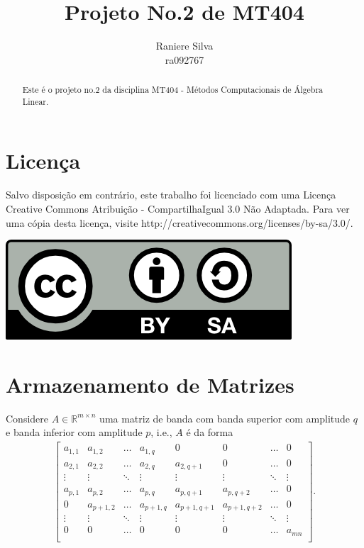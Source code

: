 \documentclass[12pt,a4paper]{article}
\begin{document}
\title{Projeto No.2 de MT404}
\author{Raniere Silva \\ ra092767}
\maketitle
\begin{abstract}
    Este \'{e} o projeto no.2 da disciplina MT404 - M\'{e}todos Computacionais de \'{A}lgebra Linear.
\end{abstract}
\tableofcontents
\lstlistoflistings
\section*{Licen\c{c}a}
Salvo disposi\c{c}\~{a}o em contr\'{a}rio, este trabalho foi licenciado com uma Licen\c{c}a Creative Commons Atribui\c{c}\~{a}o - CompartilhaIgual 3.0 N\~{a}o Adaptada. Para ver uma c\'{o}pia desta licen\c{c}a, visite http://creativecommons.org/licenses/by-sa/3.0/.
\begin{center}
    \includegraphics{../figuras/cc-by-sa.png}
\end{center}
\newpage
\section{Armazenamento de Matrizes}
Considere $A \in \mathbb{R}^{m \times n}$ uma matriz de banda com banda superior com amplitude $q$ e banda inferior com amplitude $p$, i.e., $A$ \'{e} da forma
\begin{align*}
    \begin{bmatrix}
        a_{1,1} & a_{1,2} & \ldots & a_{1,q} & 0 & 0 & \ldots & 0 \\
        a_{2,1} & a_{2,2} & \ldots & a_{2,q} & a_{2,q+1} & 0 & \ldots & 0 \\
        \vdots & \vdots & \ddots & \vdots & \vdots & \vdots & \ddots & \vdots \\
        a_{p,1} & a_{p,2} & \ldots & a_{p,q} & a_{p,q+1} & a_{p,q+2} & \ldots & 0 \\
        0 & a_{p+1,2} & \ldots & a_{p+1,q} & a_{p+1,q+1} & a_{p+1,q+2} & \ldots & 0 \\
        \vdots & \vdots & \ddots & \vdots & \vdots & \vdots & \ddots & \vdots \\
        0 & 0 & \ldots & 0 & 0 & 0 & \ldots & a_{mn} \\
    \end{bmatrix}.
\end{align*}
\end{document}
